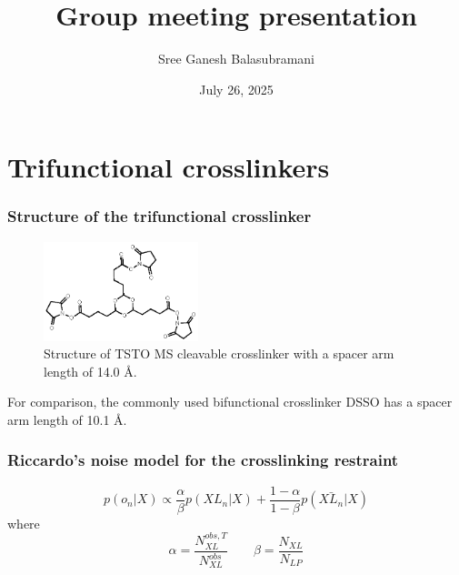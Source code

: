 \documentclass[a4paper,8pt]{beamer}
\title{Group meeting presentation}
\author[S. G. Balasubramani]{Sree Ganesh Balasubramani}
\institute[UCSF]{Echeverria \& {\v S}ali Groups \\ University of California, San Francisco}
\date{July 26, 2025}
\begin{document}
\maketitle

\section{Trifunctional crosslinkers}
\begin{frame}
  \frametitle{Structure of the trifunctional crosslinker}
  
  \begin{figure}
    \centering
    \includegraphics[width=0.4\textwidth]{figures/tri-linker.eps}
    \caption{Structure of TSTO MS cleavable crosslinker with a spacer arm length 
    of 14.0 \AA.}
  \end{figure}
  \begin{block}{}
    For comparison, the commonly used bifunctional crosslinker
  DSSO has a spacer arm length of 10.1 \AA.
    \end{block}
\end{frame}
\begin{frame}
\frametitle{Riccardo's noise model for the crosslinking restraint}
\begin{equation}
p(o_n|X) \propto \frac{\alpha}{\beta}p(XL_n|X) + \frac{1 - \alpha}{1 - \beta}p(\bar{XL_n}|X)
\end{equation}
where 
\begin{equation}
\alpha = \frac{N^{obs, T}_{XL}}{N^{obs}_{XL}} \qquad \beta = \frac{N_{XL}}{N_{LP}}
\end{equation}
\end{frame}
\end{document}
